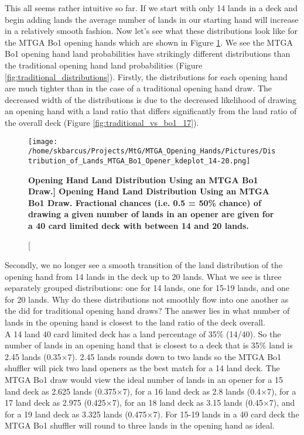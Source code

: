 \documentclass[oneside]{book}   %
\begin{document}
This all seems rather intuitive so far. If we start with only 14 lands in a deck and begin adding lands the average number of lands in our starting hand will increase in a relatively smooth fashion. Now let's see what these distributions look like for the MTGA Bo1 opening hands which are shown in Figure \ref{fig:bo1_distributions}. We see the MTGA Bo1 opening hand land probabilities have strikingly different distributions than the traditional opening hand land probabilities (Figure \ref{fig:traditional_distributions}). Firstly, the distributions for each opening hand are much tighter than in the case of a traditional opening hand draw. The decreased width of the distributions is due to the decreased likelihood of drawing an opening hand with a land ratio that differs significantly from the land ratio of the overall deck (Figure \ref{fig:traditional_vs_bo1_17}).\\

 	\begin{figure}[!ht]
	\centering
	\centerline{\texttt{[image: /home/skbarcus/Projects/MtG/MTGA\_Opening\_Hands/Pictures/Distribution\_of\_Lands\_MTGA\_Bo1\_Opener\_kdeplot\_14-20.png]}}
	\caption[\bf{Opening Hand Land Distribution Using an MTGA Bo1 Draw.}]{
	{\bf{Opening Hand Land Distribution Using an MTGA Bo1 Draw.}} Fractional chances (i.e. 0.5 = 50\% chance) of drawing a given number of lands in an opener are given for a 40 card limited deck with between 14 and 20 lands.}
	\label{fig:bo1_distributions}
	\end{figure}	

Secondly, we no longer see a smooth transition of the land distribution of the opening hand from 14 lands in the deck up to 20 lands. What we see is three separately grouped distributions: one for 14 lands, one for 15-19 lands, and one for 20 lands. Why do these distributions not smoothly flow into one another as the did for traditional opening hand draws? The answer lies in what number of lands in the opening hand is closest to the land ratio of the deck overall. \\

A 14 land 40 card limited deck has a land percentage of 35\% (14/40). So the number of lands in an opening hand that is closest to a deck that is 35\% land is 2.45 lands (0.35$\times$7). 2.45 lands rounds down to two lands so the MTGA Bo1 shuffler will pick two land openers as the best match for a 14 land deck. The MTGA Bo1 draw would view the ideal number of lands in an opener for a 15 land deck as 2.625 lands (0.375$\times$7), for a 16 land deck as 2.8 lands (0.4$\times$7), for a 17 land deck as 2.975 (0.425$\times$7), for an 18 land deck as 3.15 lands (0.45$\times$7), and for a 19 land deck as 3.325 lands (0.475$\times$7). For 15-19 lands in a 40 card deck the MTGA Bo1 shuffler will round to three lands in the opening hand as ideal. \\
\end{document}
